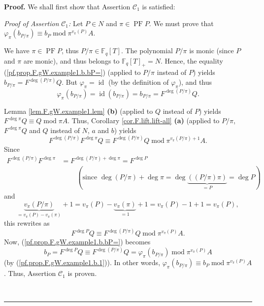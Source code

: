 \documentclass[numbers=enddot,12pt,final,onecolumn,notitlepage]{scrartcl}%
\theoremstyle{definition}
\newenvironment{proof}[1][Proof]{\noindent\textbf{#1.} }{\ \rule{0.5em}{0.5em}}
\begin{document}
\begin{proof}
We shall first show that Assertion $\mathcal{C}_{1}$ is satisfied:

\textit{Proof of Assertion }$\mathcal{C}_{1}$\textit{:} Let $P\in N$ and
$\pi\in\operatorname*{PF}P$. We must prove that $\varphi_{\pi}\left(
b_{P/\pi}\right)  \equiv b_{P}\operatorname{mod}\pi^{v_{\pi}\left(  P\right)
}A$.

We have $\pi\in\operatorname*{PF}P$, thus $P/\pi\in\mathbb{F}_{q}\left[
T\right]  $. The polynomial $P/\pi$ is monic (since $P$ and $\pi$ are monic),
and thus belongs to $\mathbb{F}_{q}\left[  T\right]  _{+}=N$. Hence, the
equality (\ref{pf.prop.F.gW.example1.b.bP=}) (applied to $P/\pi$ instead of
$P$) yields $b_{P/\pi}=F^{\deg\left(  P/\pi\right)  }Q$. But $\varphi_{\pi
}=\operatorname*{id}$ (by the definition of $\varphi_{\pi}$), and thus%
\begin{equation}
\varphi_{\pi}\left(  b_{P/\pi}\right)  =\operatorname*{id}\left(  b_{P/\pi
}\right)  =b_{P/\pi}=F^{\deg\left(  P/\pi\right)  }Q.
\label{pf.prop.F.gW.example1.b.1}%
\end{equation}


Lemma \ref{lem.F.gW.example1.lem} \textbf{(b)} (applied to $Q$ instead of $P$)
yields $F^{\deg\pi}Q\equiv Q\operatorname{mod}\pi A$. Thus, Corollary
\ref{cor.F.lift.lift-all} \textbf{(a)} (applied to $P/\pi$, $F^{\deg\pi}Q$ and
$Q$ instead of $N$, $a$ and $b$) yields%
\[
F^{\deg\left(  P/\pi\right)  }F^{\deg\pi}Q\equiv F^{\deg\left(  P/\pi\right)
}Q\operatorname{mod}\pi^{v_{\pi}\left(  P/\pi\right)  +1}A.
\]
Since%
\begin{align*}
F^{\deg\left(  P/\pi\right)  }F^{\deg\pi}  &  =F^{\deg\left(  P/\pi\right)
+\deg\pi}=F^{\deg P}\\
&  \ \ \ \ \ \ \ \ \ \ \left(  \text{since }\deg\left(  P/\pi\right)  +\deg
\pi=\deg\underbrace{\left(  \left(  P/\pi\right)  \pi\right)  }_{=P}=\deg
P\right)
\end{align*}
and
\[
\underbrace{v_{\pi}\left(  P/\pi\right)  }_{=v_{\pi}\left(  P\right)  -v_{\pi
}\left(  \pi\right)  }+1=v_{\pi}\left(  P\right)  -\underbrace{v_{\pi}\left(
\pi\right)  }_{=1}+1=v_{\pi}\left(  P\right)  -1+1=v_{\pi}\left(  P\right)  ,
\]
this rewrites as
\[
F^{\deg P}Q\equiv F^{\deg\left(  P/\pi\right)  }Q\operatorname{mod}\pi
^{v_{\pi}\left(  P\right)  }A.
\]
Now, (\ref{pf.prop.F.gW.example1.b.bP=}) becomes%
\[
b_{P}=F^{\deg P}Q\equiv F^{\deg\left(  P/\pi\right)  }Q=\varphi_{\pi}\left(
b_{P/\pi}\right)  \operatorname{mod}\pi^{v_{\pi}\left(  P\right)  }A
\]
(by (\ref{pf.prop.F.gW.example1.b.1})). In other words, $\varphi_{\pi}\left(
b_{P/\pi}\right)  \equiv b_{P}\operatorname{mod}\pi^{v_{\pi}\left(  P\right)
}A$. Thus, Assertion $\mathcal{C}_{1}$ is proven.


\end{proof}
\end{document}
